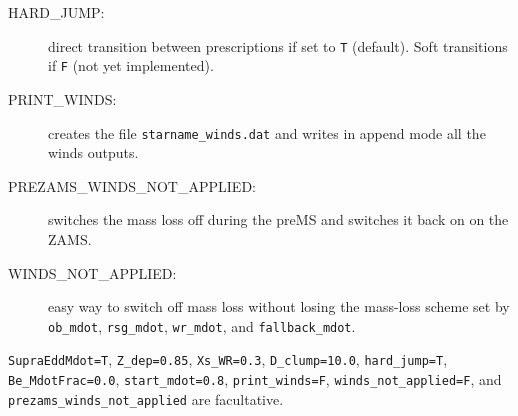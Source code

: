 \documentclass[11pt]{article}
\begin{document}
\begin{description}
\begin{description}
      \item[HARD\_JUMP:] direct transition between prescriptions if set to \texttt{T} (default). Soft transitions if \texttt{F} (not yet implemented).
      \item[PRINT\_WINDS:] creates the file \texttt{starname\_winds.dat} and writes in append mode all the winds outputs.
      \item[PREZAMS\_WINDS\_NOT\_APPLIED:] switches the mass loss off during the preMS and switches it back on on the ZAMS.
      \item[WINDS\_NOT\_APPLIED:] easy way to switch off mass loss without losing the mass-loss scheme set by \texttt{ob\_mdot}, \texttt{rsg\_mdot}, \texttt{wr\_mdot}, and \texttt{fallback\_mdot}.
    \end{description}
    \texttt{SupraEddMdot=T}, \texttt{Z\_dep=0.85}, \texttt{Xs\_WR=0.3}, \texttt{D\_clump=10.0}, \texttt{hard\_jump=T}, \texttt{Be\_MdotFrac=0.0}, \texttt{start\_mdot=0.8}, \texttt{print\_winds=F}, \texttt{winds\_not\_applied=F}, and \texttt{prezams\_winds\_not\_applied} are facultative.


\end{description}
\end{document}
